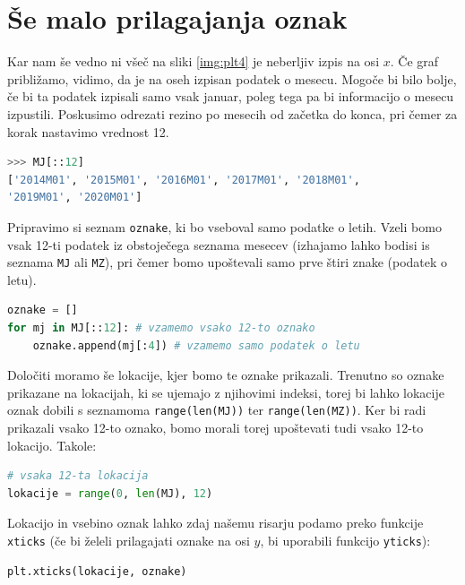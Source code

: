 \section{Še malo prilagajanja oznak}
Kar nam še vedno ni všeč na sliki \ref{img:plt4} je neberljiv izpis na osi $x$. Če graf približamo, vidimo, da je na oseh izpisan podatek o mesecu. Mogoče bi bilo bolje, če bi ta podatek izpisali samo vsak januar, poleg tega pa bi informacijo o mesecu izpustili. Poskusimo odrezati rezino po mesecih od začetka do konca, pri čemer za korak nastavimo vrednost 12.
\begin{lstlisting}[language=Python, showstringspaces=false]
>>> MJ[::12]
['2014M01', '2015M01', '2016M01', '2017M01', '2018M01',
'2019M01', '2020M01']
\end{lstlisting}
Pripravimo si seznam \texttt{oznake}, ki bo vseboval samo podatke o letih. Vzeli bomo vsak 12-ti podatek iz obstoječega seznama mesecev (izhajamo lahko bodisi is seznama \texttt{MJ} ali \texttt{MZ}), pri čemer bomo upoštevali samo prve štiri znake (podatek o letu). 
\begin{lstlisting}[language=Python, showstringspaces=false]
oznake = []
for mj in MJ[::12]: # vzamemo vsako 12-to oznako
    oznake.append(mj[:4]) # vzamemo samo podatek o letu
\end{lstlisting}
Določiti moramo še lokacije, kjer bomo te oznake prikazali. Trenutno so oznake prikazane na lokacijah, ki se ujemajo z njihovimi indeksi, torej bi lahko lokacije oznak dobili s seznamoma \texttt{range(len(MJ))} ter \texttt{range(len(MZ))}. Ker bi radi prikazali vsako 12-to oznako, bomo morali torej upoštevati tudi vsako 12-to lokacijo. Takole:
\begin{lstlisting}[language=Python, showstringspaces=false]
# vsaka 12-ta lokacija
lokacije = range(0, len(MJ), 12) 
\end{lstlisting}

Lokacijo in vsebino oznak lahko zdaj našemu risarju podamo preko funkcije \texttt{xticks} (če bi želeli prilagajati oznake na osi $y$, bi uporabili funkcijo \texttt{yticks}):
\begin{lstlisting}[language=Python, showstringspaces=false]
plt.xticks(lokacije, oznake)
\end{lstlisting}

